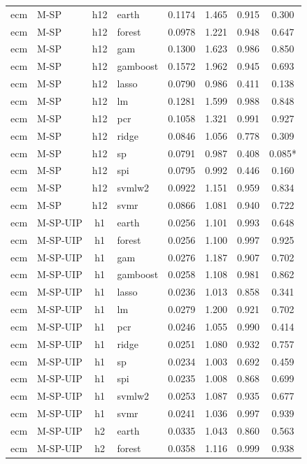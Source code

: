 \begin{ThreePartTable}
\begin{longtable}[t]{llclcccc}
\addlinespace
ecm & M-SP & h12 & earth & 0.1174 & 1.465 & 0.915 & 0.300\\
ecm & M-SP & h12 & forest & 0.0978 & 1.221 & 0.948 & 0.647\\
ecm & M-SP & h12 & gam & 0.1300 & 1.623 & 0.986 & 0.850\\
ecm & M-SP & h12 & gamboost & 0.1572 & 1.962 & 0.945 & 0.693\\
ecm & M-SP & h12 & lasso & 0.0790 & 0.986 & 0.411 & 0.138\\
ecm & M-SP & h12 & lm & 0.1281 & 1.599 & 0.988 & 0.848\\
ecm & M-SP & h12 & pcr & 0.1058 & 1.321 & 0.991 & 0.927\\
ecm & M-SP & h12 & ridge & 0.0846 & 1.056 & 0.778 & 0.309\\
ecm & M-SP & h12 & sp & 0.0791 & 0.987 & 0.408 & 0.085*\\
ecm & M-SP & h12 & spi & 0.0795 & 0.992 & 0.446 & 0.160\\
ecm & M-SP & h12 & svmlw2 & 0.0922 & 1.151 & 0.959 & 0.834\\
ecm & M-SP & h12 & svmr & 0.0866 & 1.081 & 0.940 & 0.722\\
\addlinespace
ecm & M-SP-UIP & h1 & earth & 0.0256 & 1.101 & 0.993 & 0.648\\
ecm & M-SP-UIP & h1 & forest & 0.0256 & 1.100 & 0.997 & 0.925\\
ecm & M-SP-UIP & h1 & gam & 0.0276 & 1.187 & 0.907 & 0.702\\
ecm & M-SP-UIP & h1 & gamboost & 0.0258 & 1.108 & 0.981 & 0.862\\
ecm & M-SP-UIP & h1 & lasso & 0.0236 & 1.013 & 0.858 & 0.341\\
ecm & M-SP-UIP & h1 & lm & 0.0279 & 1.200 & 0.921 & 0.702\\
ecm & M-SP-UIP & h1 & pcr & 0.0246 & 1.055 & 0.990 & 0.414\\
ecm & M-SP-UIP & h1 & ridge & 0.0251 & 1.080 & 0.932 & 0.757\\
ecm & M-SP-UIP & h1 & sp & 0.0234 & 1.003 & 0.692 & 0.459\\
ecm & M-SP-UIP & h1 & spi & 0.0235 & 1.008 & 0.868 & 0.699\\
ecm & M-SP-UIP & h1 & svmlw2 & 0.0253 & 1.087 & 0.935 & 0.677\\
ecm & M-SP-UIP & h1 & svmr & 0.0241 & 1.036 & 0.997 & 0.939\\
\addlinespace
ecm & M-SP-UIP & h2 & earth & 0.0335 & 1.043 & 0.860 & 0.563\\
ecm & M-SP-UIP & h2 & forest & 0.0358 & 1.116 & 0.999 & 0.938\\

\end{longtable}
\end{ThreePartTable}
